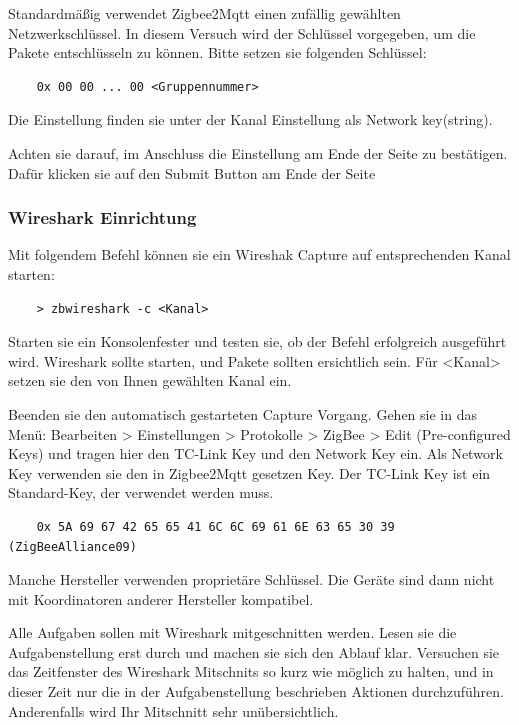 Standardmäßig verwendet Zigbee2Mqtt einen zufällig gewählten Netzwerkschlüssel. In diesem Versuch wird der Schlüssel vorgegeben, um die Pakete
entschlüsseln zu können. Bitte setzen sie folgenden Schlüssel:

\begin{lstlisting}
    0x 00 00 ... 00 <Gruppennummer>
\end{lstlisting}

Die Einstellung finden sie unter der Kanal Einstellung als \grqq Network key(string)\grqq{}.

Achten sie darauf, im Anschluss die Einstellung am Ende der Seite zu bestätigen. Dafür klicken sie auf den 
\grqq Submit \grqq{} Button am Ende der Seite

\subsubsection{Wireshark Einrichtung}
Mit folgendem Befehl können sie ein Wireshak Capture auf entsprechenden Kanal starten:

\begin{lstlisting}
    > zbwireshark -c <Kanal>
\end{lstlisting}

Starten sie ein Konsolenfester und testen sie, ob der Befehl erfolgreich ausgeführt wird. Wireshark sollte starten, und Pakete sollten ersichtlich sein. Für \grqq 
<Kanal> \grqq{} setzen sie den von Ihnen gewählten Kanal ein.

Beenden sie den automatisch gestarteten Capture Vorgang. Gehen sie in das Menü: Bearbeiten > Einstellungen > Protokolle > ZigBee > Edit (Pre-configured Keys) und tragen
hier den \grqq TC-Link Key\grqq{} und den \grqq Network Key\grqq{} ein. Als \grqq Network Key\grqq{} verwenden sie den in Zigbee2Mqtt gesetzen Key. Der \grqq TC-Link Key\grqq{} ist ein
Standard-Key, der verwendet werden muss.
\begin{lstlisting}
    0x 5A 69 67 42 65 65 41 6C 6C 69 61 6E 63 65 30 39 (ZigBeeAlliance09)
\end{lstlisting}

Manche Hersteller verwenden proprietäre Schlüssel. Die Geräte sind dann nicht mit Koordinatoren anderer Hersteller kompatibel.

\begin{Hinweis}
    Alle Aufgaben sollen mit Wireshark mitgeschnitten werden. Lesen sie die Aufgabenstellung erst durch und machen sie sich den Ablauf klar. Versuchen sie das 
    Zeitfenster des Wireshark Mitschnits so kurz wie möglich zu halten, und in dieser Zeit nur die in der Aufgabenstellung beschrieben Aktionen durchzuführen.
    Anderenfalls wird Ihr Mitschnitt sehr unübersichtlich.
\end{Hinweis}

